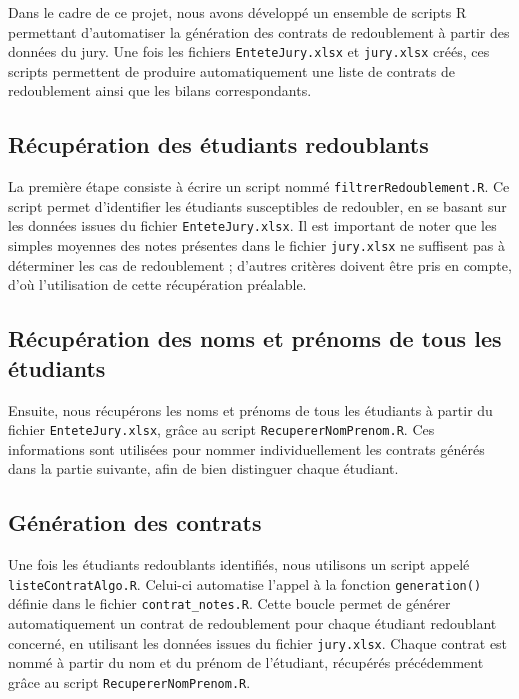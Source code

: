 Dans le cadre de ce projet, nous avons développé un ensemble de scripts R permettant d'automatiser la génération des contrats de redoublement à partir des données du jury. Une fois les fichiers \texttt{EnteteJury.xlsx} et \texttt{jury.xlsx} créés, ces scripts permettent de produire automatiquement une liste de contrats de redoublement ainsi que les bilans correspondants.


\subsection{Récupération des étudiants redoublants}

La première étape consiste à écrire un script nommé \texttt{filtrerRedoublement.R}. Ce script permet d’identifier les étudiants susceptibles de redoubler, en se basant sur les données issues du fichier \texttt{EnteteJury.xlsx}. Il est important de noter que les simples moyennes des notes présentes dans le fichier \texttt{jury.xlsx} ne suffisent pas à déterminer les cas de redoublement ; d’autres critères doivent être pris en compte, d’où l’utilisation de cette récupération préalable.

\subsection{Récupération des noms et prénoms de tous les étudiants}

Ensuite, nous récupérons les noms et prénoms de tous les étudiants à partir du fichier \texttt{EnteteJury.xlsx}, grâce au script \texttt{RecupererNomPrenom.R}. Ces informations sont utilisées pour nommer individuellement les contrats générés dans la partie suivante, afin de bien distinguer chaque étudiant.

\subsection{Génération des contrats}

Une fois les étudiants redoublants identifiés, nous utilisons un script appelé \texttt{listeContratAlgo.R}. Celui-ci automatise l’appel à la fonction \texttt{generation()} définie dans le fichier \texttt{contrat\_notes.R}. Cette boucle permet de générer automatiquement un contrat de redoublement pour chaque étudiant redoublant concerné, en utilisant les données issues du fichier \texttt{jury.xlsx}. Chaque contrat est nommé à partir du nom et du prénom de l’étudiant, récupérés précédemment grâce au script \texttt{RecupererNomPrenom.R}.


